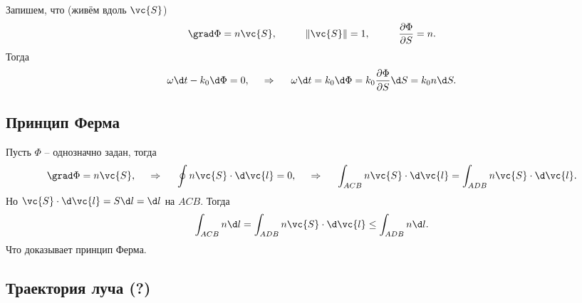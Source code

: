Запишем, что (живём вдоль $\vc{S}$)
\begin{equation*}
    \grad \Phi = n \vc{S},
    \hspace{1 cm}
    \|\vc{S}\| = 1,
    \hspace{1 cm}
    \frac{\partial \Phi}{\partial S} = n.
\end{equation*}
Тогда
\begin{equation*}
    \omega \d t - k_0 \d \Phi = 0,
    \hspace{0.5cm} \Rightarrow \hspace{0.5cm}
    \omega \d t = k_0 \d \Phi = k_0 \frac{\partial \Phi}{\partial S} \d S = k_0 n \d S.
\end{equation*}


\subsection{Принцип Ферма}

Пусть $\Phi$ -- однозначно задан, тогда 
\begin{equation*}
    \grad \Phi = n \vc{S},
    \hspace{0.5cm} \Rightarrow \hspace{0.5cm}
    \oint n \vc{S} \cdot \d \vc{l} = 0,
    \hspace{0.5cm} \Rightarrow \hspace{0.5cm}
    \int_{ACB} n \vc{S} \cdot \d \vc{l} = 
    \int_{ADB} n \vc{S} \cdot \d \vc{l}.
\end{equation*}
Но $\vc{S} \cdot \d \vc{l} = S \d l = \d l$ на $ACB$. Тогда
\begin{equation*}
    \int_{ACB} n \d l = \int_{ADB} n \vc{S} \cdot \d \vc{l} \leq \int_{ADB} n \d l.
\end{equation*}
Что доказывает принцип Ферма.


\subsection{Траектория луча (?)}

